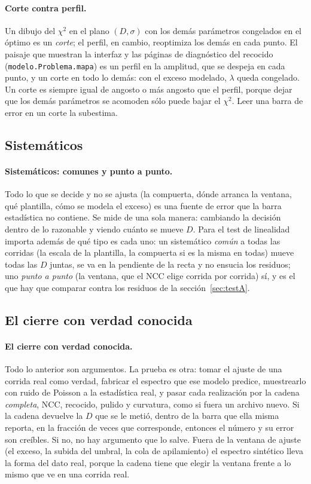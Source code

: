 \documentclass[11pt,a4paper]{article}
\begin{document}
\paragraph{Corte contra perfil.} Un dibujo del $\chi^2$ en el plano
$(D, \sigma)$ con los demás parámetros congelados en el óptimo es un
\emph{corte}; el perfil, en cambio, reoptimiza los demás en cada punto. El
paisaje que muestran la interfaz y las páginas de diagnóstico del recocido
(\texttt{modelo.Problema.mapa}) es un perfil en la amplitud, que se despeja
en cada punto, y un corte en todo lo demás: con el exceso modelado, $\lambda$
queda congelado. Un corte es siempre igual de angosto o más angosto que el
perfil, porque dejar que los demás parámetros se acomoden sólo puede bajar el
$\chi^2$. Leer una barra de error en un corte la subestima.

\subsection{Sistemáticos}
\label{sec:est-sist}

\paragraph{Sistemáticos: comunes y punto a punto.} Todo lo que se decide y no
se ajusta (la compuerta, dónde arranca la ventana, qué plantilla, cómo se
modela el exceso) es una fuente de error que la barra estadística no
contiene. Se mide de una sola manera: cambiando la decisión dentro de lo
razonable y viendo cuánto se mueve $D$. Para el test de linealidad importa
además de qué tipo es cada uno: un sistemático \emph{común} a todas las
corridas (la escala de la plantilla, la compuerta si es la misma en todas)
mueve todas las $D$ juntas, se va en la pendiente de la recta y no ensucia
los residuos; uno \emph{punto a punto} (la ventana, que el NCC elige corrida
por corrida) sí, y es el que hay que comparar contra los residuos de la
sección~\ref{sec:testA}.

\subsection{El cierre con verdad conocida}
\label{sec:est-cierre}

\paragraph{El cierre con verdad conocida.} Todo lo anterior son argumentos.
La prueba es otra: tomar el ajuste de una corrida real como verdad, fabricar
el espectro que ese modelo predice, muestrearlo con ruido de Poisson a la
estadística real, y pasar cada realización por la cadena \emph{completa},
NCC, recocido, pulido y curvatura, como si fuera un archivo nuevo. Si la
cadena devuelve la $D$ que se le metió, dentro de la barra que ella misma
reporta, en la fracción de veces que corresponde, entonces el número y su
error son creíbles. Si no, no hay argumento que lo salve. Fuera de la ventana
de ajuste (el exceso, la subida del umbral, la cola de apilamiento) el
espectro sintético lleva la forma del dato real, porque la cadena tiene que
elegir la ventana frente a lo mismo que ve en una corrida real.
\end{document}
